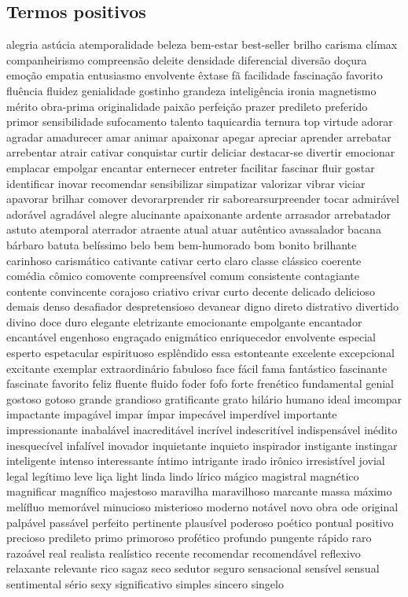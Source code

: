 \begin{appendices}
\subsection{Termos positivos}
alegria ast\'{u}cia atemporalidade beleza bem-estar best-seller brilho carisma cl\'{i}max companheirismo compreens\~ao deleite densidade diferencial divers\~ao do\c{c}ura emo\c{c}\~ao empatia entusiasmo envolvente \^{e}xtase f\~a facilidade fascina\c{c}\~ao favorito flu\^{e}ncia fluidez genialidade gostinho grandeza intelig\^{e}ncia ironia magnetismo m\'{e}rito obra-prima originalidade paix\~ao perfei\c{c}\~ao prazer predileto preferido primor sensibilidade sufocamento talento taquicardia ternura top virtude adorar agradar amadurecer amar animar apaixonar apegar apreciar aprender arrebatar arrebentar atrair cativar conquistar curtir deliciar destacar-se divertir emocionar emplacar empolgar encantar enternecer entreter facilitar fascinar fluir gostar identificar inovar recomendar sensibilizar simpatizar valorizar vibrar viciar apavorar brilhar comover devorarprender rir saborearsurpreender tocar admir\'{a}vel ador\'{a}vel agrad\'{a}vel alegre alucinante apaixonante ardente arrasador arrebatador astuto atemporal aterrador atraente atual atuar aut\^{e}ntico avassalador bacana b\'{a}rbaro batuta bel\'{i}ssimo belo bem bem-humorado bom bonito brilhante carinhoso carism\'{a}tico cativante cativar certo claro classe cl\'{a}ssico coerente com\'{e}dia c\^{o}mico comovente compreens\'{i}vel comum consistente contagiante contente convincente corajoso criativo crivar curto decente delicado delicioso demais denso desafiador despretensioso devanear digno direto distrativo divertido divino doce duro elegante eletrizante emocionante empolgante encantador encant\'{a}vel engenhoso engra\c{c}ado enigm\'{a}tico enriquecedor envolvente especial esperto espetacular espirituoso espl\^{e}ndido essa estonteante excelente excepcional excitante exemplar extraordin\'{a}rio fabuloso face f\'{a}cil fama fant\'{a}stico fascinante fascinate favorito feliz fluente fluido foder fofo forte fren\'{e}tico fundamental genial gostoso gotoso grande grandioso gratificante grato hil\'{a}rio humano ideal imcompar impactante impag\'{a}vel impar \'{i}mpar impec\'{a}vel imperd\'{i}vel importante impressionante inabal\'{a}vel inacredit\'{a}vel incr\'{i}vel indescrit\'{i}vel indispens\'{a}vel in\'{e}dito inesquec\'{i}vel infal\'{i}vel inovador inquietante inquieto inspirador instigante instingar inteligente intenso interessante \'{i}ntimo intrigante irado ir\^{o}nico irresist\'{i}vel jovial legal leg\'{i}timo leve li\c{c}a light linda lindo l\'{i}rico m\'{a}gico magistral magn\'{e}tico magnificar magn\'{i}fico majestoso maravilha maravilhoso marcante massa m\'{a}ximo mel\'{i}fluo memor\'{a}vel minucioso misterioso moderno not\'{a}vel novo obra ode original palp\'{a}vel pass\'{a}vel perfeito pertinente plaus\'{i}vel poderoso po\'{e}tico pontual positivo precioso predileto primo primoroso prof\'{e}tico profundo pungente r\'{a}pido raro razo\'{a}vel real realista real\'{i}stico recente recomendar recomend\'{a}vel reflexivo relaxante relevante rico sagaz seco sedutor seguro sensacional sens\'{i}vel sensual sentimental s\'{e}rio sexy significativo simples sincero singelo 
\end{appendices}
